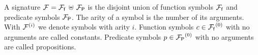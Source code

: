 
\begin{definition}\label{def:signature}
A {\myem signature} ${\mathcal F}={{\mathcal F}_{\mathsf f}}\,\uplus\,{{\mathcal F}_{\mathsf P}}$ is the disjoint union 
of {\myem function symbols} ${{\mathcal F}_{\mathsf f}}$ 
and {\myem predicate symbols} ${{\mathcal F}_{\mathsf P}}$.
The {\myem arity} of a symbol is the number of its arguments.
With ${\mathcal F}^{(i)}$ we denote symbols with arity $i$.
Function symbols $c\in{{\mathcal F}_{\mathsf f}}^{(0)}$ with no arguments are called {\myem constants}.
Predicate symbols $p\in{{\mathcal F}_{\mathsf P}}^{(0)}$ with no arguments are called propositions. 
\end{definition}

